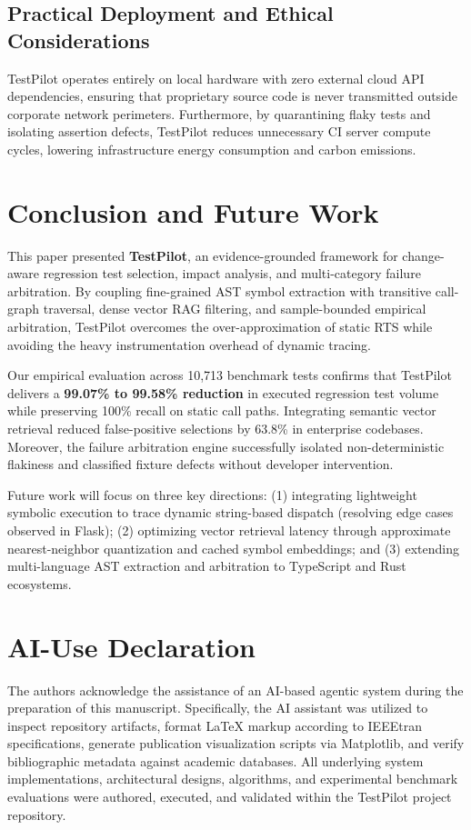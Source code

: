 \documentclass[12pt,onecolumn,draftclsnofoot]{IEEEtran}
\begin{document}
\subsection{Practical Deployment and Ethical Considerations}
TestPilot operates entirely on local hardware with zero external cloud API dependencies, ensuring that proprietary source code is never transmitted outside corporate network perimeters. Furthermore, by quarantining flaky tests and isolating assertion defects, TestPilot reduces unnecessary CI server compute cycles, lowering infrastructure energy consumption and carbon emissions.

\section{Conclusion and Future Work}
\label{sec:conclusion}

This paper presented \textbf{TestPilot}, an evidence-grounded framework for change-aware regression test selection, impact analysis, and multi-category failure arbitration. By coupling fine-grained AST symbol extraction with transitive call-graph traversal, dense vector RAG filtering, and sample-bounded empirical arbitration, TestPilot overcomes the over-approximation of static RTS while avoiding the heavy instrumentation overhead of dynamic tracing. 

Our empirical evaluation across 10,713 benchmark tests confirms that TestPilot delivers a \textbf{99.07\% to 99.58\% reduction} in executed regression test volume while preserving 100\% recall on static call paths. Integrating semantic vector retrieval reduced false-positive selections by 63.8\% in enterprise codebases. Moreover, the failure arbitration engine successfully isolated non-deterministic flakiness and classified fixture defects without developer intervention.

Future work will focus on three key directions: (1) integrating lightweight symbolic execution to trace dynamic string-based dispatch (resolving edge cases observed in Flask); (2) optimizing vector retrieval latency through approximate nearest-neighbor quantization and cached symbol embeddings; and (3) extending multi-language AST extraction and arbitration to TypeScript and Rust ecosystems.

\section*{AI-Use Declaration}
The authors acknowledge the assistance of an AI-based agentic system during the preparation of this manuscript. Specifically, the AI assistant was utilized to inspect repository artifacts, format LaTeX markup according to IEEEtran specifications, generate publication visualization scripts via Matplotlib, and verify bibliographic metadata against academic databases. All underlying system implementations, architectural designs, algorithms, and experimental benchmark evaluations were authored, executed, and validated within the TestPilot project repository.
\end{document}
